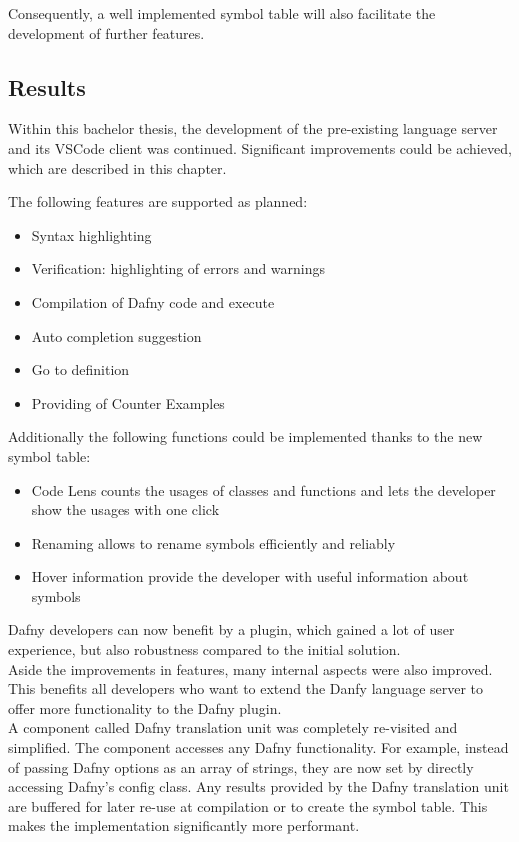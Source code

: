 Consequently, a well implemented symbol table will also facilitate the development of further features.

\subsection{Results}
Within this bachelor thesis, the development of the pre-existing language server and its VSCode client was continued.
Significant improvements could be achieved, which are described in this chapter.

The following features are supported as planned:
\begin{itemize}
    \item Syntax highlighting
    \item Verification: highlighting of errors and warnings
    \item Compilation of Dafny code and execute
    \item Auto completion suggestion
    \item Go to definition
    \item Providing of Counter Examples
\end{itemize}

Additionally the following functions could be implemented thanks to the new symbol table:
\begin{itemize}
    \item Code Lens counts the usages of classes and functions and lets the developer show the usages with one click
    \item Renaming allows to rename symbols efficiently and reliably
    \item Hover information provide the developer with useful information about symbols
\end{itemize}

Dafny developers can now benefit by a plugin, which gained a lot of user experience, but also robustness compared to the initial solution.\\

Aside the improvements in features, many internal aspects were also improved.
This benefits all developers who want to extend the Danfy language server to offer more functionality to the Dafny plugin. \\

A component called Dafny translation unit was completely re-visited and simplified.
The component accesses any Dafny functionality.
For example, instead of passing Dafny options as an array of strings, they are now set by
directly accessing Dafny's config class.
Any results provided by the Dafny translation unit are buffered for later re-use at compilation or to create the symbol table.
This makes the implementation significantly more performant.\\

